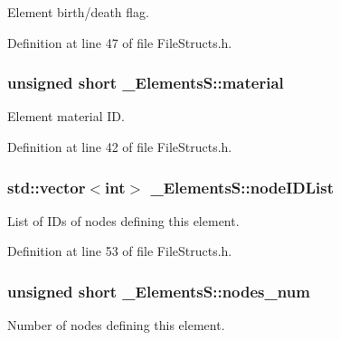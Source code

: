 Element birth/death flag. 



Definition at line 47 of file File\+Structs.\+h.

\subsubsection[{\texorpdfstring{material}{material}}]{\setlength{\rightskip}{0pt plus 5cm}unsigned short \+\_\+\+Elements\+S\+::material}\hypertarget{struct___elements_s_ac64ee48e51f13b1e7aabb9b6a48cb726}{}\label{struct___elements_s_ac64ee48e51f13b1e7aabb9b6a48cb726}


Element material ID. 



Definition at line 42 of file File\+Structs.\+h.

\subsubsection[{\texorpdfstring{node\+I\+D\+List}{nodeIDList}}]{\setlength{\rightskip}{0pt plus 5cm}std\+::vector$<$int$>$ \+\_\+\+Elements\+S\+::node\+I\+D\+List}\hypertarget{struct___elements_s_a9e3631ebed48f8c5869f08f0970c251c}{}\label{struct___elements_s_a9e3631ebed48f8c5869f08f0970c251c}


List of I\+Ds of nodes defining this element. 



Definition at line 53 of file File\+Structs.\+h.

\subsubsection[{\texorpdfstring{nodes\+\_\+num}{nodes_num}}]{\setlength{\rightskip}{0pt plus 5cm}unsigned short \+\_\+\+Elements\+S\+::nodes\+\_\+num}\hypertarget{struct___elements_s_a49bec774408021bd15702208237fb17f}{}\label{struct___elements_s_a49bec774408021bd15702208237fb17f}


Number of nodes defining this element. 



